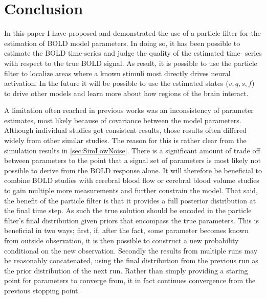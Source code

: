 \chapter{Conclusion}
\label{sec:Conclusion}
In this paper I have proposed and demonstrated the use of a particle filter
for the estimation of BOLD model parameters. In doing so, it has been possible
to estimate the BOLD time-series and judge the quality of the estimated time-
series with respect to the true BOLD signal. As result, it is possible to use
the particle filter to localize areas where a known stimuli most directly drives
neural activation. In the future it will be possible to use the estimated states
($v,q,s,f$) to drive other models and learn more about how regions of the brain
interact. 

A limitation often reached in previous works was an inconsistency of
parameter estimates, most likely because of covariance between the model parameters.
Although individual studies got consistent results, those results often differed
widely from other similar studies. The reason for this is rather clear from the
simulation results in \autoref{sec:SimLowNoise}. There is a significant amount of
trade off between parameters to the point that a signal set of parameters
is most likely not possible to derive from the BOLD response alone. It
will therefore be beneficial to combine BOLD studies with cerebral blood
flow or cerebral blood volume studies to gain multiple more measurements and
further constrain the model. That said, the benefit of the particle filter
is that it provides a full posterior distribution at the final time step.
As such the true solution should be encoded in the particle filter's final 
distribution given priors that encompass the true parameters. This is beneficial
in two ways; first, if, after the fact, some parameter becomes known 
from outside observation, it is then possible to construct a new probability
conditional on the new observation. Secondly the results from multiple runs
may be reasonably concatenated, using the final distribution from the previous
run as the prior distribution of the next run. Rather than simply providing a 
staring point for parameters to converge from, it in fact continues convergence
from the previous stopping point. 

